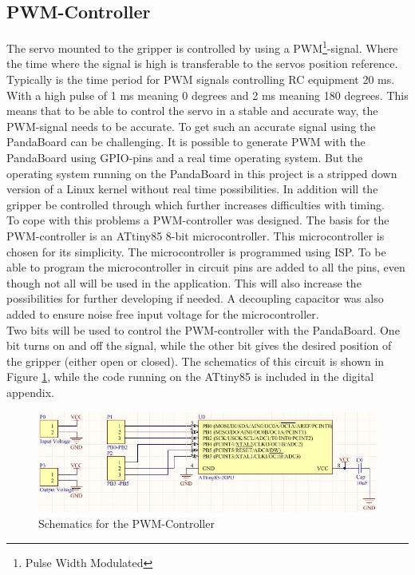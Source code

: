 \subsection{PWM-Controller}
The servo mounted to the gripper is controlled by using a PWM\footnote{Pulse Width Modulated}-signal. Where the time where the signal is high is transferable to the servos position reference. Typically is the time period for PWM signals controlling RC equipment 20 ms. With a high pulse of 1 ms meaning 0 degrees and 2 ms meaning 180 degrees. This means that to be able to control the servo in a stable and accurate way, the PWM-signal needs to be accurate. To get such an accurate signal using the PandaBoard can be challenging. It is possible to 
generate PWM with the PandaBoard using GPIO-pins and a real time operating system. But the operating system running on the PandaBoard in this project is a stripped down version of a Linux kernel without real time possibilities. In addition will the gripper be controlled through which further increases difficulties with timing.\\
\newline
To cope with this problems a PWM-controller was designed. The basis for the PWM-controller is an ATtiny85 8-bit microcontroller. This microcontroller is chosen for its simplicity. The microcontroller is programmed using ISP. To be able to program the microcontroller in circuit pins are added to all the pins, even though not all will be used in the application. This will also increase the possibilities for further developing if needed. A decoupling capacitor was also added to ensure noise free input voltage for the microcontroller.\\
\newline
Two bits will be used to control the PWM-controller with the PandaBoard. One bit turns on and off the signal, while the other bit gives the desired position of the gripper (either open or closed). The schematics of this circuit is shown in Figure \ref{pwm}, while the code running on the ATtiny85 is included in the digital appendix.
\begin{figure}[H]
\centering
\includegraphics[width = 16cm]{fig/krets/pwm.JPG}
\caption{Schematics for the PWM-Controller}
\label{pwm}
\end{figure}\noindent
